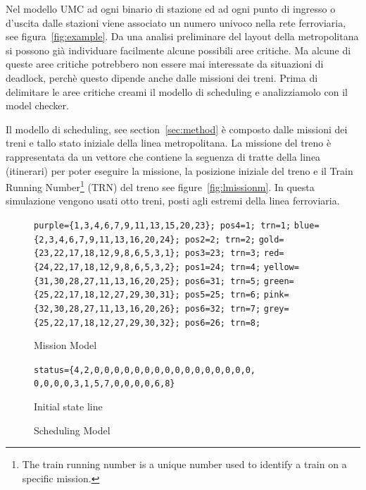 \documentclass{ewic}
\makeatletter
\newenvironment{SubFloat}[2][]%
			{\def\sf@one{#1}%
			\def\sf@two{#2}%
			\setbox\sf@box\hbox
			\bgroup}%
			{ \egroup
			\ifx\@empty\sf@two\@empty\relax
			\def\sf@two{\@empty}
			\fi
			\ifx\@empty\sf@one\@empty\relax
			\subfloat[\sf@two]{\box\sf@box}%
			\else
			\subfloat[\sf@one][\sf@two]{\box\sf@box}%
			\fi}
\makeatother
\begin{document}
		
			Nel modello UMC ad ogni binario di stazione ed ad ogni punto di ingresso o d'uscita dalle stazioni viene associato un numero univoco nella rete ferroviaria, see figura~\ref{fig:example}.
			Da una analisi preliminare del layout della metropolitana si possono già individuare facilmente alcune possibili aree critiche. Ma alcune di queste aree critiche potrebbero non essere mai interessate da situazioni di deadlock, perchè questo dipende anche dalle missioni dei treni. Prima di delimitare le aree critiche creami il modello di scheduling e analizziamolo con il model checker.
			
			Il modello di scheduling, see section~\ref{sec:method} è composto dalle missioni dei treni e tallo stato iniziale della linea metropolitana.
			La missione del treno è rappresentata da un vettore che contiene la seguenza di tratte della linea (itinerari) per poter eseguire la missione, la posizione iniziale del treno e il Train Running Number\footnote{The train running number is a unique number used to identify a train on a specific mission.} (TRN) del treno see figure~\ref{fig:lmissionm}.
			In questa simulazione vengono usati otto treni, posti agli estremi della linea ferroviaria. 
			
			\begin{figure}[!htp]
			 \centering
			  \begin{SubFloat}{\label{fig:lmissionm}Mission Model}
			\begin{footnotesize}
			  \begin{minipage}{2.9in} 
			\centering
			\verb+purple={1,3,4,6,7,9,11,13,15,20,23}; pos4=1; trn=1;+
			\verb+blue={2,3,4,6,7,9,11,13,16,20,24}; pos2=2; trn=2;+
			\verb+gold={23,22,17,18,12,9,8,6,5,3,1}; pos3=23; trn=3;+
			\verb+red={24,22,17,18,12,9,8,6,5,3,2}; pos1=24; trn=4;+
			\verb+yellow={31,30,28,27,11,13,16,20,25}; pos6=31; trn=5;+
			\verb+green={25,22,17,18,12,27,29,30,31}; pos5=25; trn=6;+
			\verb+pink={32,30,28,27,11,13,16,20,26}; pos6=32; trn=7;+
			\verb+grey={25,22,17,18,12,27,29,30,32}; pos6=26; trn=8;+
			\end{minipage}%
			  \end{footnotesize}  
			\end{SubFloat}
			 \begin{SubFloat}{Initial state line\label{fig:lstateline}}
			 \begin{footnotesize}
			   \begin{minipage}{2.9in}\centering
			\verb+status={4,2,0,0,0,0,0,0,0,0,0,0,0,0,0,0,0,0,+
			\verb+0,0,0,0,3,1,5,7,0,0,0,0,6,8}+
			\end{minipage}%
			\end{footnotesize}
			\end{SubFloat}
			
			\caption{Scheduling Model}
			 \label{fig:SchedulingModel}
			 \end{figure}
			
\end{document}
